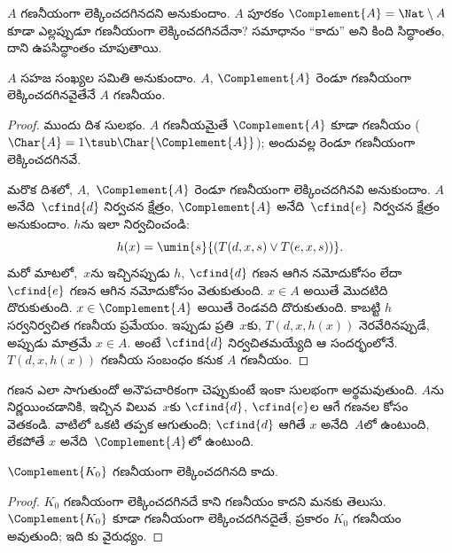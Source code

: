 \documentclass[../../../include/open-logic-section]{subfiles}
\begin{document}

$A$ గణనీయంగా లెక్కించదగినదని అనుకుందాం. $A$ పూరకం
$\Complement{A}=\Nat\setminus A$ కూడా ఎల్లప్పుడూ గణనీయంగా
లెక్కించదగినదేనా? సమాధానం ``కాదు'' అని కింది సిద్ధాంతం, దాని
ఉపసిద్ధాంతం చూపుతాయి.

\begin{thm}
$A$ సహజ సంఖ్యల సమితి అనుకుందాం. $A$, $\Complement{A}$ రెండూ
గణనీయంగా లెక్కించదగినవైతేనే $A$ గణనీయం.
\end{thm}

\begin{proof}
ముందు దిశ సులభం. $A$ గణనీయమైతే $\Complement{A}$ కూడా గణనీయం
($\Char{A}=1\tsub\Char{\Complement{A}}$); అందువల్ల రెండూ
గణనీయంగా లెక్కించదగినవే.

మరొక దిశలో, $A$,~$\Complement{A}$ రెండూ గణనీయంగా లెక్కించదగినవి
అనుకుందాం. $A$ అనేది~$\cfind{d}$ నిర్వచన క్షేత్రం,
$\Complement{A}$ అనేది~$\cfind{e}$ నిర్వచన క్షేత్రం అనుకుందాం.
$h$ను ఇలా నిర్వచించండి:
\[
h(x)=\umin{s}{(T(d,x,s)\lor T(e,x,s))}.
\]
మరో మాటలో,~$x$ను ఇచ్చినప్పుడు $h$, $\cfind{d}$ గణన ఆగిన నమోదుకోసం
లేదా $\cfind{e}$ గణన ఆగిన నమోదుకోసం వెతుకుతుంది. $x\in A$ అయితే
మొదటిది దొరుకుతుంది. $x\in\Complement{A}$ అయితే రెండవది దొరుకుతుంది.
కాబట్టి $h$ సర్వనిర్వచిత గణనీయ ప్రమేయం. ఇప్పుడు ప్రతి~$x$కు,
$T(d,x,h(x))$ నెరవేరినప్పుడే, అప్పుడు మాత్రమే $x\in A$. అంటే
$\cfind{d}$ నిర్వచితమయ్యేది ఆ సందర్భంలోనే. $T(d,x,h(x))$ గణనీయ సంబంధం కనుక $A$ గణనీయం.
\end{proof}

\begin{explain}
గణన ఎలా సాగుతుందో అనౌపచారికంగా చెప్పుకుంటే ఇంకా సులభంగా అర్థమవుతుంది.
$A$ను నిర్ణయించడానికి, ఇచ్చిన విలువ~$x$కు $\cfind{d}$, $\cfind{e}$ల
ఆగే గణనల కోసం వెతకండి. వాటిలో ఒకటి తప్పక ఆగుతుంది; $\cfind{d}$
ఆగితే $x$ అనేది~$A$లో ఉంటుంది, లేకపోతే $x$ అనేది~$\Complement{A}$లో
ఉంటుంది.
\end{explain}

\begin{cor}
$\Complement{K_0}$ గణనీయంగా లెక్కించదగినది కాదు.
\end{cor}

\begin{proof}
$K_0$ గణనీయంగా లెక్కించదగినదే కాని గణనీయం కాదని మనకు తెలుసు.
$\Complement{K_0}$ కూడా గణనీయంగా లెక్కించదగినదైతే,
 ప్రకారం $K_0$ గణనీయం అవుతుంది; ఇది
కు వైరుధ్యం.
\end{proof}
\end{document}
